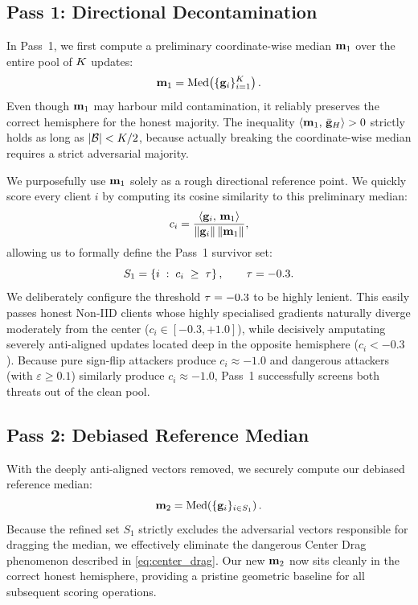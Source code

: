 \documentclass[../main.tex]{subfiles}
\begin{document}
\subsection{Pass 1: Directional Decontamination}
\label{sec:aegis_pass1}

In Pass~1, we first compute a preliminary coordinate-wise median $\mathbf{m}_{1}$ over the entire pool of $K$ updates:
\begin{equation}
    \mathbf{m}_{1} = \operatorname{Med}\!\left(\{\mathbf{g}_{i}\}_{i=1}^{K}\right).
    \label{eq:pass1_median}
\end{equation}
Even though $\mathbf{m}_{1}$ may harbour mild contamination, it reliably preserves the correct hemisphere for the honest majority. The inequality $\left\langle \mathbf{m}_{1},\, \bar{\mathbf{g}}_{H} \right\rangle > 0$ strictly holds as long as $|\mathcal{B}| < K/2$, because actually breaking the coordinate-wise median requires a strict adversarial majority.

We purposefully use $\mathbf{m}_{1}$ solely as a rough directional reference point. We quickly score every client $i$ by computing its cosine similarity to this preliminary median:
\begin{equation}
    c_i = \frac{\left\langle \mathbf{g}_{i},\, \mathbf{m}_{1} \right\rangle}{\left\lVert \mathbf{g}_{i} \right\rVert\left\lVert \mathbf{m}_{1} \right\rVert},
    \label{eq:pass1_cosine}
\end{equation}
allowing us to formally define the Pass~1 survivor set:
\begin{equation}
    S_1 = \left\{i \;:\; c_i \;\geq\; \tau\right\}, \qquad \tau = -0.3.
    \label{eq:pass1_screen}
\end{equation}
We deliberately configure the threshold $\tau = -0.3$ to be highly lenient. This easily passes honest Non-IID clients whose highly specialised gradients naturally diverge moderately from the center ($c_i \in [-0.3, +1.0]$), while decisively amputating severely anti-aligned updates located deep in the opposite hemisphere ($c_i < -0.3$). Because pure sign-flip attackers produce $c_i \approx -1.0$ and dangerous \ipm{} attackers (with $\varepsilon \geq 0.1$) similarly produce $c_i \approx -1.0$, Pass~1 successfully screens both threats out of the clean pool.

\subsection{Pass 2: Debiased Reference Median}
\label{sec:aegis_pass2}

With the deeply anti-aligned vectors removed, we securely compute our debiased reference median:
\begin{equation}
    \mathbf{m}_{2} = \operatorname{Med}\!\left(\{\mathbf{g}_{i}\}_{i \in S_1}\right).
    \label{eq:pass2_median}
\end{equation}
Because the refined set $S_1$ strictly excludes the adversarial vectors responsible for dragging the median, we effectively eliminate the dangerous Center Drag phenomenon described in \eqref{eq:center_drag}. Our new $\mathbf{m}_{2}$ now sits cleanly in the correct honest hemisphere, providing a pristine geometric baseline for all subsequent scoring operations.
\end{document}
